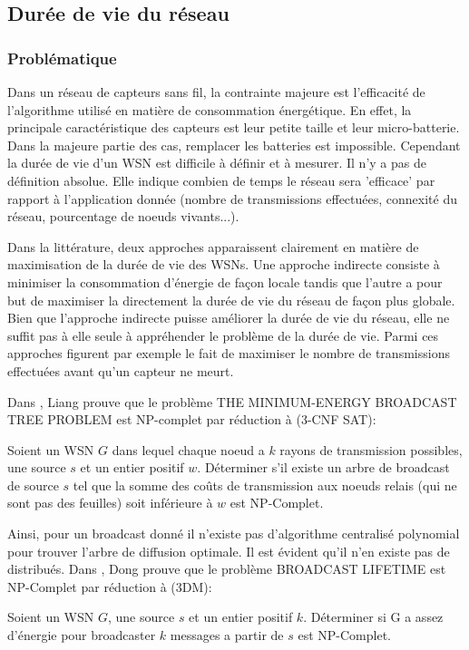 \subsection{Durée de vie du réseau}
\subsubsection{Problématique}


Dans un réseau de capteurs sans fil, la contrainte majeure est l'efficacité de l'algorithme utilisé en matière de consommation énergétique. En effet, la principale caractéristique des capteurs
est leur petite taille et leur micro-batterie. Dans la majeure partie des cas, remplacer les batteries est impossible. Cependant la durée de vie d'un WSN est difficile à définir et à mesurer.
Il n'y a pas de définition absolue. Elle indique combien de temps le réseau sera 'efficace' par rapport à l'application donnée (nombre de transmissions effectuées, connexité du réseau, pourcentage de noeuds vivants...).

Dans la littérature, deux approches apparaissent clairement en matière de maximisation de la durée de vie des WSNs. Une approche indirecte consiste à minimiser la consommation d'énergie de façon locale tandis que l'autre a pour but 
de maximiser la directement la durée de vie du réseau de façon plus globale. Bien que l'approche indirecte puisse améliorer la durée de vie du réseau, elle ne suffit pas à elle seule à appréhender le problème de la durée de vie.
Parmi ces approches figurent  par exemple le fait de maximiser le nombre de transmissions effectuées avant qu'un capteur ne meurt.

Dans \cite{Liang2002}, Liang prouve que le  problème THE MINIMUM-ENERGY BROADCAST
TREE PROBLEM est NP-complet par réduction à (3-CNF SAT):
\begin{myth}
Soient un WSN $G$ dans lequel chaque noeud a $k$ rayons de transmission possibles, une source $s$ et un entier positif $w$.
Déterminer s'il existe un arbre de broadcast de source $s$ tel que la somme des coûts de transmission aux noeuds relais (qui ne sont pas des feuilles) soit inférieure à $w$ est NP-Complet.
\end{myth}
Ainsi, pour un broadcast donné il n'existe pas d'algorithme centralisé polynomial pour trouver l'arbre de diffusion optimale. Il est évident qu'il n'en existe pas de distribués. 
Dans \cite{Dong2005}, Dong prouve que le  problème BROADCAST LIFETIME est NP-Complet par réduction à (3DM):
\begin{myth}
Soient un WSN $G$, une source $s$ et un entier positif $k$.
Déterminer si G a assez d'énergie pour broadcaster $k$ messages a partir de $s$ est NP-Complet.
\end{myth}

